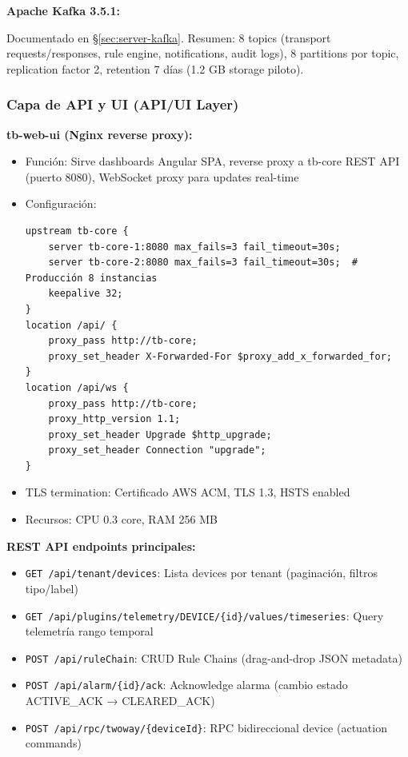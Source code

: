 \textbf{Apache Kafka 3.5.1:}

Documentado en §\ref{sec:server-kafka}. Resumen: 8 topics (transport requests/responses, rule engine, notifications, audit logs), 8 partitions por topic, replication factor 2, retention 7 días (1.2 GB storage piloto).

\subsubsection{Capa de API y UI (API/UI Layer)}

\textbf{tb-web-ui (Nginx reverse proxy):}

\begin{itemize}
    \item Función: Sirve dashboards Angular SPA, reverse proxy a tb-core REST API (puerto 8080), WebSocket proxy para updates real-time
    \item Configuración:
    \begin{verbatim}
upstream tb-core {
    server tb-core-1:8080 max_fails=3 fail_timeout=30s;
    server tb-core-2:8080 max_fails=3 fail_timeout=30s;  # Producción 8 instancias
    keepalive 32;
}
location /api/ {
    proxy_pass http://tb-core;
    proxy_set_header X-Forwarded-For $proxy_add_x_forwarded_for;
}
location /api/ws {
    proxy_pass http://tb-core;
    proxy_http_version 1.1;
    proxy_set_header Upgrade $http_upgrade;
    proxy_set_header Connection "upgrade";
}
    \end{verbatim}
    \item TLS termination: Certificado AWS ACM, TLS 1.3, HSTS enabled
    \item Recursos: CPU 0.3 core, RAM 256 MB
\end{itemize}

\textbf{REST API endpoints principales:}

\begin{itemize}
    \item \texttt{GET /api/tenant/devices}: Lista devices por tenant (paginación, filtros tipo/label)
    \item \texttt{GET /api/plugins/telemetry/DEVICE/\{id\}/values/timeseries}: Query telemetría rango temporal
    \item \texttt{POST /api/ruleChain}: CRUD Rule Chains (drag-and-drop JSON metadata)
    \item \texttt{POST /api/alarm/\{id\}/ack}: Acknowledge alarma (cambio estado ACTIVE\_ACK → CLEARED\_ACK)
    \item \texttt{POST /api/rpc/twoway/\{deviceId\}}: RPC bidireccional device (actuation commands)
\end{itemize}

